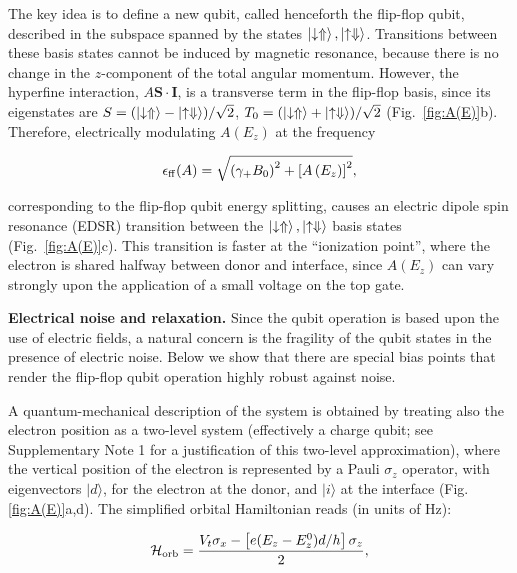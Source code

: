 \documentclass[aps,prb,superscriptaddress,nobibnotes,preprint]{revtex4-1}%
\begin{document}
The key idea is to define a new qubit, called henceforth the flip-flop qubit, described in the subspace spanned by the states $\ket{\downarrow \Uparrow}, \ket{\uparrow \Downarrow}$. Transitions between these basis states cannot be induced by magnetic resonance, because there is no change in the $z$-component of the total angular momentum. However, the hyperfine interaction, $A\mathbf{S\cdot I}$,  is a transverse term in the flip-flop basis, since its eigenstates are $S=(\ket{\downarrow \Uparrow} - \ket{\uparrow \Downarrow})/\sqrt{2}$, $T_0=(\ket{\downarrow \Uparrow} + \ket{\uparrow \Downarrow})/\sqrt{2}$ (Fig.~\ref{fig:A(E)}b). Therefore, electrically modulating $A(E_z)$ at the frequency

\begin{equation} \label{eq:e_ff}
\epsilon_{\rm ff}(A)=\sqrt{\left(\gamma_+B_0\right)^2+\left[A\left(E_z\right)\right]^2},
\end{equation}

corresponding to the flip-flop qubit energy splitting, causes an electric dipole spin resonance (EDSR) transition between the $\ket{\downarrow \Uparrow}, \ket{\uparrow \Downarrow}$ basis states \cite{Laird2007,Luo2012} (Fig.~\ref{fig:A(E)}c). This transition is faster at the ``ionization point'', where the electron is shared halfway between donor and interface, since $A(E_z)$ can vary strongly upon the application of a small voltage on the top gate.


\vspace{3mm}
\noindent\textbf{Electrical noise and relaxation.}
%
Since the qubit operation is based upon the use of electric fields, a natural concern is the fragility of the qubit states in the presence of electric noise. Below we show that there are special bias points that render the flip-flop qubit operation highly robust against noise.

A quantum-mechanical description of the system is obtained by treating also the electron position as a two-level system (effectively a charge qubit; see Supplementary Note 1 for a justification of this two-level approximation), where the vertical position of the electron is represented by a Pauli $\sigma_z$ operator, with eigenvectors $|d\rangle$, for the electron at the donor, and $|i\rangle$ at the interface (Fig. \ref{fig:A(E)}a,d). The simplified orbital Hamiltonian reads (in units of Hz):

\begin{equation} \label{eq:H_orb}
\mathcal{H}_{\rm orb}=\frac{V_t \sigma_x-\left[e(E_z - E_z^0) d/h\right]\sigma_z}{2},
\end{equation}
\end{document}
